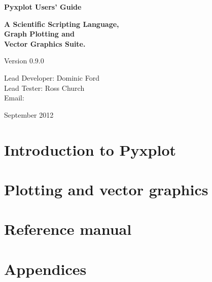 \documentclass[a4paper,onecolumn,11pt]{book}
\def\version{0.9.0}
\def\reldate{September 2012}
\begin{document}
\begin{titlepage}
\normalsize
\begin{center}
{\Huge \bf Pyxplot Users' Guide}\\
\end{center}
\newline
\begin{center}
{\LARGE \bf A Scientific Scripting Language, \\ Graph Plotting and \\ Vector Graphics Suite. \\}
\end{center}
\newline
\begin{center}
{\Large Version \version \\}
\end{center}
\newline
\begin{center}
{\large
Lead Developer: Dominic Ford \\
\vspace{1mm}
Lead Tester: Ross Church \\
\vspace{2mm}
Email:  \\
}
\end{center}
\newline
\begin{center}
{\Large \reldate \\}
\end{center}
\end{titlepage}

\part{Introduction to Pyxplot}







\part{Plotting and vector graphics}
\setcounter{chapter}{7}



\part{Reference manual}
\setcounter{chapter}{10}









\part{Appendices}
\appendix





\printindex
\end{document}
